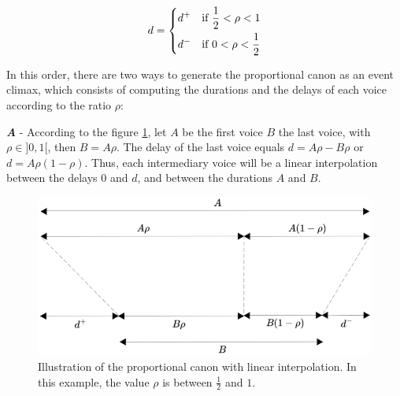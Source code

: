 \[
d=
\begin{dcases}
	 d^+ & \text{if }  \frac{1}{2} < \rho < 1\\
	d^- & \text{if }   0 < \rho < \frac{1}{2} 
   \end{dcases}
\]
 
 \bigskip
 
  In this order, there are two ways to generate the proportional canon as an event climax, which consists of computing the durations and the delays of each voice according to the ratio $\rho$:
   
\bigskip

\textbf{\textit{A}} - 
According to the figure \ref{canon1}, let $A$ be the first voice $B$ the last voice, with $\rho \in ]0,1[$, then $B=A\rho$. The delay of the last voice equals $d=A\rho-B\rho$ or $d=A\rho(1-\rho)$.
 Thus, each intermediary voice will be a linear interpolation between the delays $0$ and $d$, and between the durations $A$ and $B$.
  
  
\begin{figure}[h]
\begin{center}
\includegraphics[scale=0.8]{img/3499}
\caption{Illustration of the proportional canon with linear interpolation. In this example, the value $\rho$ is between $\frac{1}{2}$ and $1$. 
}
\label{canon1}
\end{center}
\end{figure}

